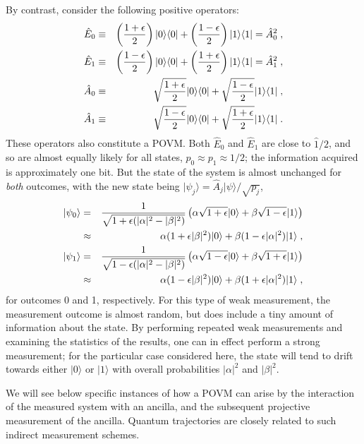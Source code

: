 \documentclass[12pt]{article}
\def\bra#1{{\langle #1 |}}
\def\ket#1{{| #1 \rangle}}
\def\id{{\hat 1}}
\def\E{{\hat E}}
\def\A{{\hat A}}
\begin{document}
By contrast, consider the following positive operators:
\begin{eqnarray}
\E_0 &\equiv& \left( {1+\epsilon \over 2} \right) \ket0\bra0
  + \left( {1-\epsilon \over 2} \right) \ket1\bra1
  = \A_0^2 \;,\nonumber\\ 
\E_1 &\equiv& \left( {1-\epsilon \over 2} \right) \ket0\bra0
  + \left( {1+\epsilon \over 2} \right) \ket1\bra1
  = \A_1^2 \;, \nonumber\\
\A_0 &\equiv& \sqrt{1+\epsilon \over 2} \ket0\bra0
  + \sqrt{1-\epsilon \over 2} \ket1\bra1 \;, \nonumber\\
\A_1 &\equiv& \sqrt{1-\epsilon \over 2} \ket0\bra0
  + \sqrt{1+\epsilon \over 2} \ket1\bra1 \;.
\label{weak2}
\end{eqnarray}
These operators also constitute a POVM.  Both $\E_0$ and $\E_1$ are close
to $\id/2$, and so are almost equally likely for all states,
$p_0 \approx p_1 \approx 1/2$; the information acquired is approximately
one bit.  But the state of the system is almost unchanged for {\it both}
outcomes, with the new state being $\ket{\psi_j} = \A_j\ket\psi/\sqrt{p_j}$,
\begin{eqnarray}
\ket{\psi_0} &=& {1\over\sqrt{1+\epsilon(|\alpha|^2-|\beta|^2)}}
  \left( \alpha\sqrt{1+\epsilon}\ket0
  + \beta\sqrt{1-\epsilon}\ket1 \right) \nonumber\\
&\approx& \alpha(1+\epsilon|\beta|^2)\ket0
  + \beta(1-\epsilon|\alpha|^2)\ket1 \;, \nonumber\\
\ket{\psi_1} &=& {1\over\sqrt{1-\epsilon(|\alpha|^2-|\beta|^2)}}
  \left( \alpha\sqrt{1-\epsilon}\ket0
  + \beta\sqrt{1+\epsilon}\ket1 \right) \nonumber\\
&\approx& \alpha(1-\epsilon|\beta|^2)\ket0
  + \beta(1+\epsilon|\alpha|^2)\ket1 \;,
\end{eqnarray}
for outcomes 0 and 1, respectively.  For this type of weak measurement,
the measurement outcome is almost random, but does include a tiny amount
of information about the state.  By performing repeated weak measurements
and examining the statistics of the results, one can in effect perform
a strong measurement; for the particular case considered here, the
state will tend to drift towards either $\ket0$ or $\ket1$ with
overall probabilities $|\alpha|^2$ and $|\beta|^2$.

We will see below specific instances of how a POVM can arise by the
interaction of the measured system with an ancilla,
and the subsequent projective measurement of the
ancilla.  Quantum trajectories are
closely related to such indirect measurement schemes.
\end{document}
